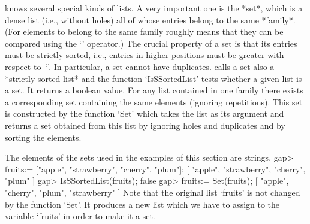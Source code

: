 
%
{\GAP} knows several special kinds of lists. A  very important one is the
*set*, which is a  dense list (i.e., without  holes) all of whose entries
belong to the same  *family*. (For elements to belong to the same family 
roughly means that they 
can be compared using the `\<' operator.) The crucial property of a set 
is that its  entries must  be strictly   sorted, i.e.,   entries in higher
positions   must be greater  with respect  to~`\<'. In  particular, a set
cannot have duplicates. {\GAP} calls a  set also a *strictly sorted list*
and the function `IsSSortedList' tests whether a given  list is a set. It
returns  a boolean value.  For any  list contained  in  one family  there
exists  a    corresponding set containing  the   same  elements (ignoring
repetitions).
This set is constructed by the function `Set' which takes the
list as  its argument   and returns a   set  obtained from this   list by
ignoring holes and duplicates and by sorting the elements.

The  elements  of  the  sets used  in  the  examples of this  section are
strings.
\beginexample
    gap> fruits:= ["apple", "strawberry", "cherry", "plum"];
    [ "apple", "strawberry", "cherry", "plum" ]
    gap> IsSSortedList(fruits);
    false
    gap> fruits:= Set(fruits);
    [ "apple", "cherry", "plum", "strawberry" ] 
\endexample
Note  that the  original list `fruits'  is not  changed  by the  function
`Set'.
It produces a new list which we have to assign to the variable `fruits'
in order to make it a set.

